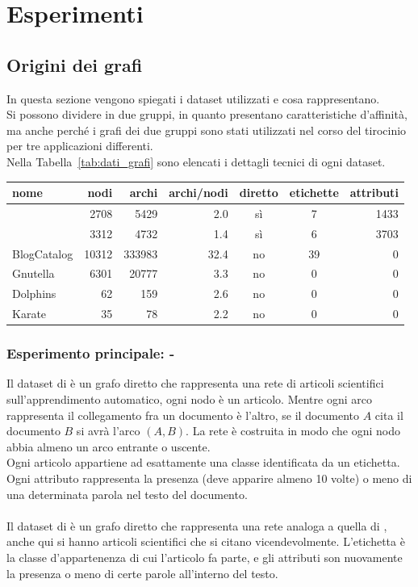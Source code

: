 %
%
\chapter{Esperimenti}
\section{Origini dei grafi}
In questa sezione vengono spiegati i dataset utilizzati e cosa rappresentano.\\
Si possono dividere in due gruppi, in quanto presentano caratteristiche d'affinità, ma anche perché i grafi dei due gruppi sono stati utilizzati nel corso del tirocinio per tre applicazioni differenti.\\
Nella Tabella~\ref{tab:dati_grafi} sono elencati i dettagli tecnici di ogni dataset.
%
\begin{center}
	\begin{tabular}{|l|r|r|r|c|c|r|}
		\hline
		nome&nodi&archi&archi/nodi&diretto&etichette&attributi\\
		\hline
		\cora & 2708 & 5429 & 2.0 & sì & 7 & 1433\\
		\citeseer & 3312 & 4732 & 1.4 & sì & 6 & 3703\\
		\hline
		BlogCatalog & 10312 & 333983 & 32.4 & no & 39 & 0\\
		Gnutella & 6301 & 20777 & 3.3 & no & 0 & 0\\
		Dolphins & 62 & 159 & 2.6 & no & 0 & 0\\
		Karate & 35 & 78 & 2.2 & no & 0 & 0\\
		\hline
		\end{tabular}
		\label{tab:dati_grafi}
\end{center}
%
\subsection*{Esperimento principale: \cora - \citeseer}\cite{Co-Ci_1}\cite{Co-Ci_2}
Il dataset di \textbf{\cora} è un grafo diretto che rappresenta una rete di articoli scientifici sull'apprendimento automatico, ogni nodo è un articolo. Mentre ogni arco rappresenta il collegamento fra un documento è l'altro, se il documento $A$ cita il documento $B$ si avrà l'arco $(A, B)$. La rete è costruita in modo che ogni nodo abbia almeno un arco entrante o uscente.\\
Ogni articolo appartiene ad esattamente una classe identificata da un etichetta. Ogni attributo rappresenta la presenza (deve apparire almeno 10 volte) o meno di una determinata parola nel testo del documento.\\
\\
Il dataset di \textbf{\citeseer} è un grafo diretto che rappresenta una rete analoga a quella di \cora, anche qui si hanno articoli scientifici che si citano vicendevolmente. L'etichetta è la classe d'appartenenza di cui l'articolo fa parte, e gli attributi son nuovamente la presenza o meno di certe parole all'interno del testo.\\
%
